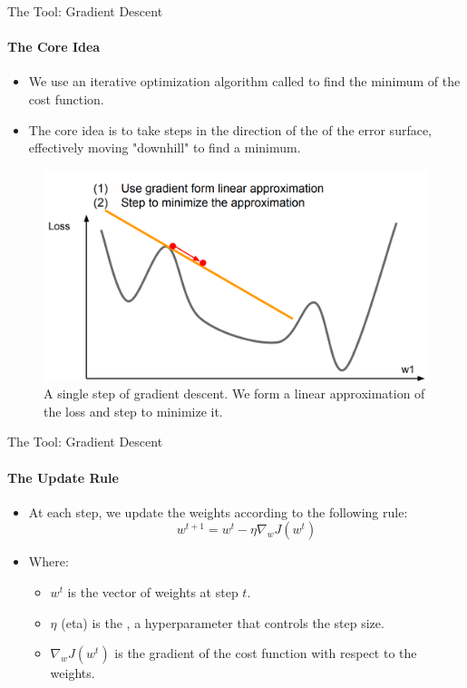 \begin{frame}{The Tool: Gradient Descent}
    \framesubtitle{The Core Idea}
    \begin{itemize}
        \item We use an iterative optimization algorithm called  to find the minimum of the cost function.
        \item The core idea is to take steps in the direction of the  of the error surface, effectively moving "downhill" to find a minimum.
    \end{itemize}
    \begin{figure}
        \centering
        \includegraphics[width=0.7\linewidth]{images/gradient_descent_step.png} 
        \caption{A single step of gradient descent. We form a linear approximation of the loss and step to minimize it.}
    \end{figure}
\end{frame}

\begin{frame}{The Tool: Gradient Descent}
    \framesubtitle{The Update Rule}
    \begin{itemize}
        \item At each step, we update the weights according to the following rule:
        \[
            w^{t+1} = w^{t} - \eta \nabla_{w}J(w^{t})
        \]
        \item Where:
        \begin{itemize}
            \item $w^{t}$ is the vector of weights at step $t$.
            \item $\eta$ (eta) is the , a hyperparameter that controls the step size.
            \item $\nabla_{w}J(w^{t})$ is the gradient of the cost function with respect to the weights.
        \end{itemize}
    \end{itemize}
\end{frame}

